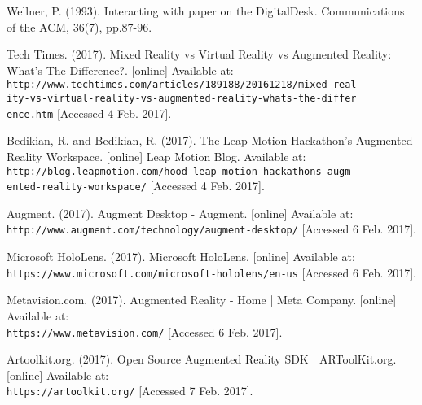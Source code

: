 \begin{thebibliography}{}
Wellner, P. (1993). Interacting with paper on the DigitalDesk. Communications of the ACM, 36(7), pp.87-96. 

Tech Times. (2017). Mixed Reality vs Virtual Reality vs Augmented Reality: What's The Difference?. [online] Available at: 
\\\texttt{http://www.techtimes.com/articles/189188/20161218/mixed-real\\ity-vs-virtual-reality-vs-augmented-reality-whats-the-differ\\ence.htm} [Accessed 4 Feb. 2017].

Bedikian, R. and Bedikian, R. (2017). The Leap Motion Hackathon’s Augmented Reality Workspace. [online] Leap Motion Blog. Available at: 
\\\texttt{http://blog.leapmotion.com/hood-leap-motion-hackathons-augm\\ented-reality-workspace/} [Accessed 4 Feb. 2017].
 
Augment. (2017). Augment Desktop - Augment. [online] Available at:
\\\texttt{http://www.augment.com/technology/augment-desktop/} [Accessed 6 Feb. 2017].

Microsoft HoloLens. (2017). Microsoft HoloLens. [online] Available at: 
\\\texttt{https://www.microsoft.com/microsoft-hololens/en-us} [Accessed 6 Feb. 2017].

Metavision.com. (2017). Augmented Reality - Home | Meta Company. [online] Available at: 
\\\texttt{https://www.metavision.com/} [Accessed 6 Feb. 2017].

Artoolkit.org. (2017). Open Source Augmented Reality SDK | ARToolKit.org. [online] Available at:
\\\texttt{https://artoolkit.org/} [Accessed 7 Feb. 2017].


\end{thebibliography}

